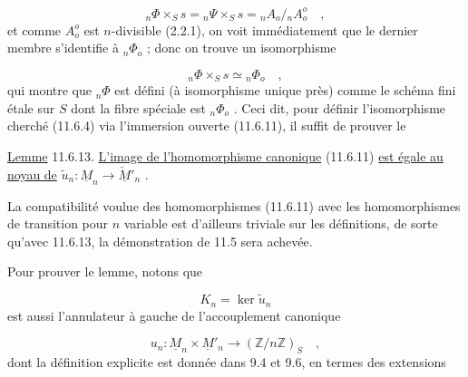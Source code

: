 \begin{equation*}
{}_n\Phi \times_S s = {}_n\Psi \times_S s = {}_nA_o/{}_nA_o^o \quad ,
\end{equation*}
et comme $A_o^o$ est $n$-divisible (2.2.1), on voit immédiatement que le dernier membre s'identifie à ${}_n\Phi_o$ ; donc on trouve un isomorphisme

\begin{equation}\tag{11.6.12}
{}_n\Phi \times_S s \simeq {}_n\Phi_o \quad ,
\end{equation}
qui montre que ${}_n\Phi$ est défini (à isomorphisme unique près) comme le schéma fini étale sur $S$ dont la fibre spéciale est ${}_n\Phi_o$ . Ceci dit, pour définir l'isomorphisme cherché (11.6.4) via l'immersion ouverte (11.6.11), il suffit de prouver le

\underline{Lemme} 11.6.13. \underline{L'image de l'homomorphisme canonique} (11.6.11) \underline{est égale au noyau de} $\tilde{u}_n : \underline{M}_n \longrightarrow \check{\underline{M}}'_n$ .

La compatibilité voulue des homomorphismes (11.6.11) avec les homomorphismes de transition pour $n$ variable est d'ailleurs triviale sur les définitions, de sorte qu'avec 11.6.13, la démonstration de 11.5 sera achevée.



Pour prouver le lemme, notons que

\begin{equation*}
K_n = \ker \tilde{u}_n
\end{equation*}
est aussi l'annulateur à gauche de l'accouplement canonique

\begin{equation*}
u_n : \underline{M}_n \times \underline{M}'_n \longrightarrow (\mathbb{Z}/n\mathbb{Z})_S \quad ,
\end{equation*}
dont la définition explicite est donnée dans 9.4 et 9.6, en termes des extensions

